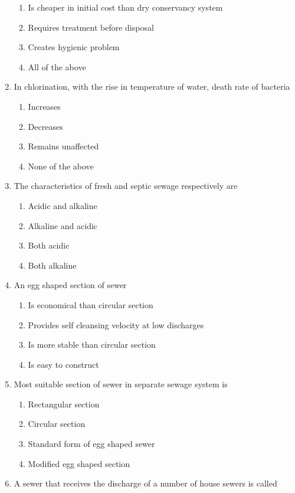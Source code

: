 \documentclass[11pt,a4paper]{article}
\begin{document}
\begin{enumerate}
\begin{enumerate}[label=\Alph*.]
\item{Is cheaper in initial cost than dry conservancy system}
\item{Requires treatment before disposal}
\item{Creates hygienic problem}
\item{All of the above}
\end{enumerate}
\item{In chlorination, with the rise in temperature of water, death rate of bacteria}
\begin{enumerate}[label=\Alph*.]
\item{Increases}
\item{Decreases}
\item{Remains unaffected}
\item{None of the above}
\end{enumerate}
\item{The characteristics of fresh and septic sewage respectively are}
\begin{enumerate}[label=\Alph*.]
\item{Acidic and alkaline}
\item{Alkaline and acidic}
\item{Both acidic}
\item{Both alkaline}
\end{enumerate}
\item{An egg shaped section of sewer}
\begin{enumerate}[label=\Alph*.]
\item{Is economical than circular section}
\item{Provides self cleansing velocity at low discharges}
\item{Is more stable than circular section}
\item{Is easy to construct}
\end{enumerate}
\item{Most suitable section of sewer in separate sewage system is}
\begin{enumerate}[label=\Alph*.]
\item{Rectangular section}
\item{Circular section}
\item{Standard form of egg shaped sewer}
\item{Modified egg shaped section}
\end{enumerate}
\item{A sewer that receives the discharge of a number of house sewers is called}
\begin{enumerate}[label=\Alph*.]

\end{enumerate}
\end{enumerate}
\end{document}
